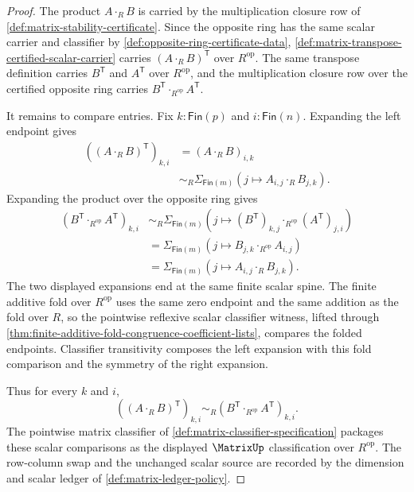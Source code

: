 \begin{proof}
The product $A\cdot_RB$ is carried by the multiplication closure row of
\autoref{def:matrix-stability-certificate}. Since the opposite ring has the
same scalar carrier and classifier by \autoref{def:opposite-ring-certificate-data},
\autoref{def:matrix-transpose-certified-scalar-carrier} carries
$(A\cdot_RB)^{\mathsf{T}}$ over $R^{\mathrm{op}}$. The same transpose
definition carries $B^{\mathsf{T}}$ and $A^{\mathsf{T}}$ over
$R^{\mathrm{op}}$, and the multiplication closure row over the certified
opposite ring carries $B^{\mathsf{T}}\cdot_{R^{\mathrm{op}}}A^{\mathsf{T}}$.

It remains to compare entries. Fix $k:\mathsf{Fin}(p)$ and $i:\mathsf{Fin}(n)$.
Expanding the left endpoint gives
$$
\begin{aligned}
((A\cdot_RB)^{\mathsf{T}})_{k,i}
&=(A\cdot_RB)_{i,k} \\
&\sim_R
\Sigma_{\mathsf{Fin}(m)}(j\mapsto A_{i,j}\cdot_RB_{j,k}).
\end{aligned}
$$
Expanding the product over the opposite ring gives
$$
\begin{aligned}
(B^{\mathsf{T}}\cdot_{R^{\mathrm{op}}}A^{\mathsf{T}})_{k,i}
&\sim_R
\Sigma_{\mathsf{Fin}(m)}(j\mapsto
  (B^{\mathsf{T}})_{k,j}\cdot_{R^{\mathrm{op}}}(A^{\mathsf{T}})_{j,i}) \\
&=
\Sigma_{\mathsf{Fin}(m)}(j\mapsto B_{j,k}\cdot_{R^{\mathrm{op}}}A_{i,j}) \\
&=
\Sigma_{\mathsf{Fin}(m)}(j\mapsto A_{i,j}\cdot_RB_{j,k}).
\end{aligned}
$$
The two displayed expansions end at the same finite scalar spine. The finite
additive fold over $R^{\mathrm{op}}$ uses the same zero endpoint and the same
addition as the fold over $R$, so the pointwise reflexive scalar classifier
witness, lifted through
\autoref{thm:finite-additive-fold-congruence-coefficient-lists}, compares the
folded endpoints. Classifier transitivity composes the left expansion with
this fold comparison and the symmetry of the right expansion.

Thus for every $k$ and $i$,
$$
((A\cdot_RB)^{\mathsf{T}})_{k,i}
\sim_R
(B^{\mathsf{T}}\cdot_{R^{\mathrm{op}}}A^{\mathsf{T}})_{k,i}.
$$
The pointwise matrix classifier of \autoref{def:matrix-classifier-specification}
packages these scalar comparisons as the displayed $\MatrixUp$ classification
over $R^{\mathrm{op}}$. The row-column swap and the unchanged scalar source are
recorded by the dimension and scalar ledger of \autoref{def:matrix-ledger-policy}.
\end{proof}
